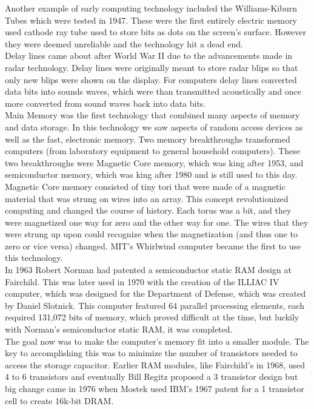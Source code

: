 \documentclass[letterpaper, 10 pt, conference]{IEEEconf}
\begin{document}
Another example of early computing technology included the Williams-Kiburn Tubes which were tested in 1947. These were the first entirely electric memory used cathode ray tube used to store bits as dots on the screen's surface. However they were deemed unreliable and the technology hit a dead end. \\

Delay lines came about after World War II due to the advancements made in radar technology. Delay lines were originally meant to store radar blips so that only new blips were shown on the display. For computers delay lines converted data bits into sounds waves, which were than transmitted acoustically and once more converted from sound waves back into data bits. \\

Main Memory was the first technology that combined many aspects of memory and data storage. In this technology we saw aspects of random access devices as well as the fast, electronic memory. Two memory breakthroughs transformed computers (from laboratory equipment to general household computers). These two breakthroughs were Magnetic Core memory, which was king after 1953, and semiconductor memory, which was king after 1980 and is still used to this day.\\

Magnetic Core memory consisted of tiny tori that were made of a magnetic material that was strung on wires into an array. This concept revolutionized computing and changed the course of history. Each torus was a bit, and they were magnetized one way for zero and the other way for one. The wires that they were strung up upon could recognize when the magnetization (and thus one to zero or vice versa) changed. MIT's Whirlwind computer became the first to use this technology.\\

In 1963 Robert Norman had patented a semiconductor static RAM design at Fairchild. This was later used in 1970 with the creation of the ILLIAC IV computer, which was designed for the Department of Defense, which was created by Daniel Slotnick. This computer featured 64 parallel processing elements, each required 131,072 bits of memory, which proved difficult at the time, but luckily with Norman's semiconductor static RAM, it was completed.\\

The goal now was to make the computer's memory fit into a smaller module. The key to accomplishing this was to minimize the number of transistors needed to access the storage capacitor. Earlier RAM modules, like Fairchild's in 1968, used 4 to 6 transistors and eventually Bill Regitz proposed a 3 transistor design but big change came in 1976 when Mostek used IBM's 1967 patent for a 1 transistor cell to create 16k-bit DRAM.\\
\end{document}
